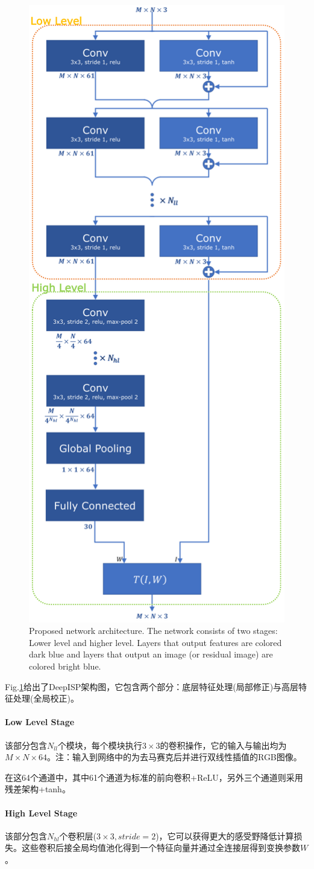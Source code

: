 \documentclass[letterpaper,12pt]{article}
\begin{document}
			\begin{figure}[ht] 
				\centering
				\includegraphics[width=0.3\columnwidth]{network_architecture_DeepISP}
				\captionsetup{font=scriptsize}
				\caption{
					\label{fig: network architecture DeepISP} 
					Proposed network architecture. The network consists of two stages: Lower level and higher level. Layers that output features are colored dark blue and layers that output an image (or residual image) are colored bright blue.}
			\end{figure}
		
		
			Fig.\ref{fig: network architecture DeepISP}给出了DeepISP架构图，它包含两个部分：底层特征处理(局部修正)与高层特征处理(全局校正)。
		
			\paragraph{Low Level Stage} \qquad
				
			该部分包含$N_{ll}$个模块，每个模块执行$3\times3$的卷积操作，它的输入与输出均为$M\times N\times64$。注：输入到网络中的为去马赛克后并进行双线性插值的RGB图像。
			
			在这64个通道中，其中61个通道为标准的前向卷积+ReLU，另外三个通道则采用残差架构+tanh。
			
			\paragraph{High Level Stage} \qquad
			
			该部分包含$N_{hl}$个卷积层($3\times3,stride=2$)，它可以获得更大的感受野降低计算损失。这些卷积后接全局均值池化得到一个特征向量并通过全连接层得到变换参数$W$。
			
\end{document}
